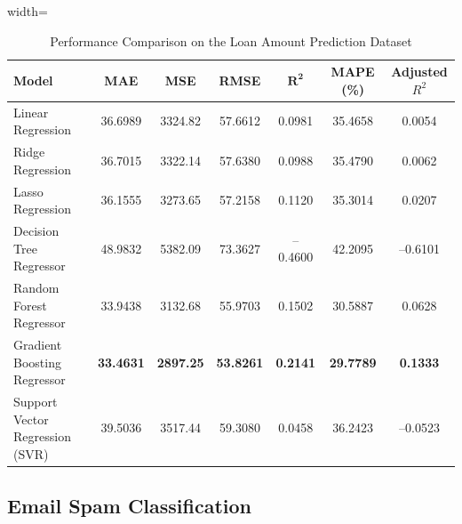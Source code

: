 \documentclass[12pt,a4paper]{article}
\begin{document}
\begin{table}[H]
\centering
\caption{Performance Comparison on the Loan Amount Prediction Dataset}
\label{tab:loan_results}

\renewcommand{\arraystretch}{1.2}

\begin{adjustbox}{width=\textwidth}
\begin{tabular}{lcccccc}

\toprule

\textbf{Model}
&
\textbf{MAE}
&
\textbf{MSE}
&
\textbf{RMSE}
&
$\mathbf{R^2}$
&
\textbf{MAPE (\%)}
&
\textbf{Adjusted $R^2$}

\\

\midrule

Linear Regression
&
36.6989
&
3324.82
&
57.6612
&
0.0981
&
35.4658
&
0.0054
\\

Ridge Regression
&
36.7015
&
3322.14
&
57.6380
&
0.0988
&
35.4790
&
0.0062
\\

Lasso Regression
&
36.1555
&
3273.65
&
57.2158
&
0.1120
&
35.3014
&
0.0207
\\

Decision Tree Regressor
&
48.9832
&
5382.09
&
73.3627
&
--0.4600
&
42.2095
&
--0.6101
\\

Random Forest Regressor
&
33.9438
&
3132.68
&
55.9703
&
0.1502
&
30.5887
&
0.0628
\\

Gradient Boosting Regressor
&
\textbf{33.4631}
&
\textbf{2897.25}
&
\textbf{53.8261}
&
\textbf{0.2141}
&
\textbf{29.7789}
&
\textbf{0.1333}
\\

Support Vector Regression (SVR)
&
39.5036
&
3517.44
&
59.3080
&
0.0458
&
36.2423
&
--0.0523
\\

\bottomrule

\end{tabular}
\end{adjustbox}

\end{table}

\subsection{Email Spam Classification}
\end{document}
